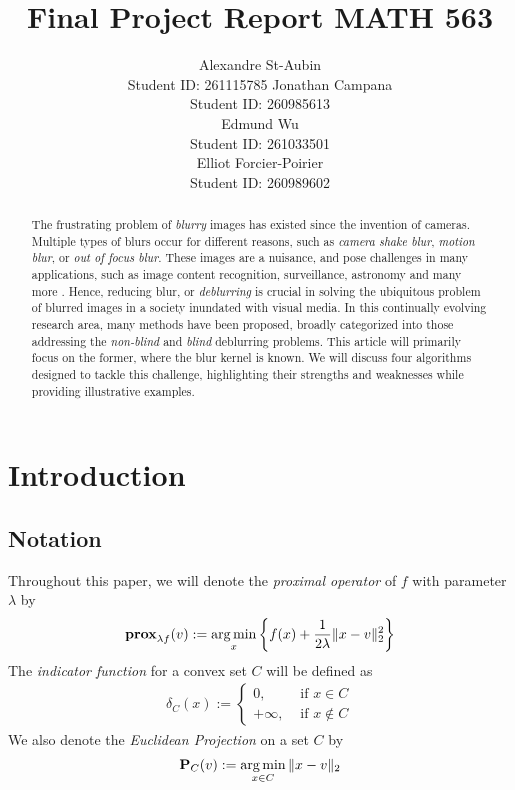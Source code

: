 \documentclass{article}
\title{Final Project Report MATH 563}
\author{%
  Alexandre St-Aubin \\
  Student ID: 261115785
  \And
 Jonathan Campana \\
 Student ID: 260985613 \\
 \AND
 Edmund Wu\\
 Student ID: 261033501 \\
 \And
 Elliot Forcier-Poirier\\
 Student ID: 260989602\\  
}
\theoremstyle{definition}
\theoremstyle{remark}
\begin{document}
\maketitle

\begin{abstract}
  The frustrating problem of \textit{blurry} images has existed since the invention of cameras. Multiple types of blurs occur for different reasons, such as \textit{camera shake blur}, \textit{motion blur}, or \textit{out of focus blur}. These images are a nuisance, and pose challenges in many applications, such as image content recognition, surveillance, astronomy and many more \cite{wang2014recent}. Hence, reducing blur, or \textit{deblurring} is crucial in solving the ubiquitous problem of blurred images in a society inundated with visual media. In this continually evolving research area, many methods have been proposed, broadly categorized into those addressing the \textit{non-blind} and \textit{blind} deblurring problems. This article will primarily focus on the former, where the blur kernel is known. We will discuss four algorithms designed to tackle this challenge, highlighting their strengths and weaknesses while providing illustrative examples.
\end{abstract}

\section{Introduction}
\subsection{Notation}%
  \label{sub:Notation}
  Throughout this paper, we will denote the \textit{proximal operator} of $f$ with parameter $\lambda$ by 
  \begin{equation}
    \begin{split}
      \operatorname{\mathbf{prox}}_{\lambda f}(v) := \operatorname*{{arg\,min}}_x \left\{f(x) + \frac{1}{2\lambda} \| x - v\|_2^2 \right\}
    \end{split}
  \end{equation}
  The \textit{indicator function} for a convex set $C$ will be defined as 
  \begin{equation}
    \begin{split}
      \delta_C (x) := 
      \begin{cases}
        0, &\text{ if } x \in C\\
        +\infty, &\text{ if } x \notin C
      \end{cases}
    \end{split}
  \end{equation}
  We also denote the \textit{Euclidean Projection} on a set $C$ by 
  \begin{equation}
    \begin{split}
      \operatorname{\mathbf{P}}_C(v):= \operatorname*{{arg\,min}}_{x\in C} \| x -v \|_2
    \end{split}
  \end{equation}
  
\end{document}

